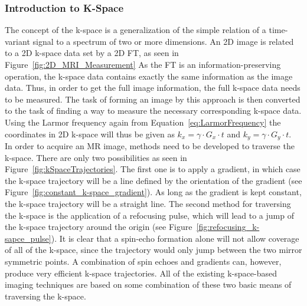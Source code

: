 \documentclass[english,version-2022-01]{uzl-thesis} %
\begin{document}
\subsubsection{Introduction to K-Space}
The concept of the k-space is a generalization of the simple relation of a time-variant signal to a spectrum of two or more dimensions. An 2D image is related to a 2D k-space data set by a 2D FT, as seen in Figure~\ref{fig:2D_MRI_Measurement}
As the FT is an information-preserving operation, the k-space data contains exactly the same information as the image data. Thus, in order to get the full image information, the full k-space data needs to be measured. The task of forming an image by this approach is then converted to the task of finding a way to measure the necessary corresponding k-space data. 
Using the Larmor frequency again from Equation~\ref{eq:LarmorFrequency} the coordinates in 2D k-space will thus be given as $k_x = \gamma \cdot G_x \cdot t$ and $k_y = \gamma \cdot G_y \cdot t$. \\
In order to acquire an MR image, methods need to be developed 
to traverse the k-space.
There are only two possibilities as seen in Figure~\ref{fig:kSpaceTrajectories}. The first one is to apply a gradient, in which case the k-space trajectory will be a line defined by the orientation of the gradient (see Figure~\ref{fig:constant_k-space_gradient}). As long as the gradient is kept constant, the k-space trajectory will be a straight line. 
The second method for traversing the k-space is the application of a refocusing pulse, which will lead to a jump of the k-space trajectory around the origin (see Figure~\ref{fig:refocusing_k-sapce_pulse}). It is clear that a spin-echo formation alone will not allow coverage of all of the k-space, since the trajectory would only jump between the two mirror symmetric points. A combination of spin echoes and gradients can, however, produce very efficient k-space trajectories. All of the existing k-space-based imaging techniques are based on some combination of these two basic means of traversing the k-space. \\
\end{document}
